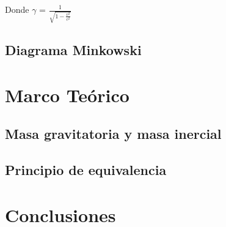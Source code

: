 \documentclass[12pt,twoside]{rif}
\begin{document}
Donde $\gamma$ = $\frac{1}{\sqrt{1-\frac{v^{2}}{c^{2}}}}$
	
	
	\subsection{Diagrama Minkowski}
	
	
	
	\section{Marco Teórico}
		\subsection{Masa gravitatoria y masa inercial}

		\subsection{Principio de equivalencia}
	\section{Conclusiones}
	
	\nocite{*}
	
	
	
\end{document}
